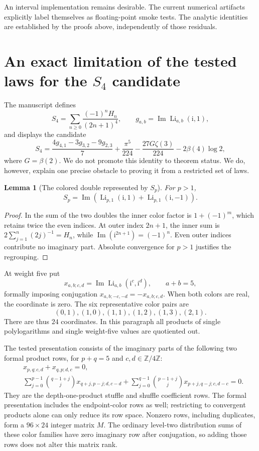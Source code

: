 \documentclass[11pt]{article}
\numberwithin{equation}{section}
\newtheorem{lemma}[theorem]{Lemma}
\theoremstyle{definition}\newtheorem{definition}[theorem]{Definition}
\theoremstyle{remark}\newtheorem{remark}[theorem]{Remark}
\DeclareMathOperator{\Li}{Li}
\DeclareMathOperator{\Ima}{Im}
\newcommand{\Z}{\mathbb Z}\newcommand{\U}{\mathcal U}
\newcommand{\ii}{\mathrm i}
\begin{document}
An interval implementation remains desirable. The current numerical
artifacts explicitly label themselves as floating-point smoke tests. The
analytic identities are established by the proofs above, independently of
those residuals.

\section{An exact limitation of the tested laws for the \texorpdfstring{$S_4$}{S4} candidate}

The manuscript defines
\[
S_4=\sum_{n\ge0}\frac{(-1)^nH_n}{(2n+1)^4},\qquad
g_{a,b}=\Ima\Li_{a,b}(\ii,1),
\]
and displays the candidate
\begin{equation}\label{eq:S4candidate}
S_4=\frac{4g_{4,1}-3g_{3,2}-9g_{2,3}}7
+\frac{\pi^5}{224}-\frac{27G\zeta(3)}{224}
-2\beta(4)\log2,
\end{equation}
where $G=\beta(2)$. We do not promote this identity to theorem status.
We do, however, explain one precise obstacle to proving it from a restricted
set of laws.

\begin{lemma}[The colored double represented by $S_p$]\label{lem:Sdouble}
For $p>1$,
\begin{equation}\label{eq:Sdouble}
S_p=\Ima\left(\Li_{p,1}(\ii,1)+\Li_{p,1}(\ii,-1)\right).
\end{equation}
\end{lemma}
\begin{proof}
In the sum of the two doubles the inner color factor is $1+(-1)^m$,
which retains twice the even indices. At outer index $2n+1$, the inner
sum is $2\sum_{j=1}^n(2j)^{-1}=H_n$, while
$\Ima(\ii^{2n+1})=(-1)^n$. Even outer indices contribute no imaginary
part. Absolute convergence for $p>1$ justifies the regrouping.
\end{proof}

At weight five put
\[
x_{a,b;c,d}=\Ima\Li_{a,b}(\ii^c,\ii^d),\qquad a+b=5,
\]
formally imposing conjugation
$x_{a,b;-c,-d}=-x_{a,b;c,d}$. When both colors are real, the coordinate is
zero. The six representative color pairs are
\[
(0,1),(1,0),(1,1),(1,2),(1,3),(2,1).
\]
There are thus $24$ coordinates. In this paragraph all products of single
polylogarithms and single weight-five values are quotiented out.

The tested presentation consists of the imaginary parts of the following
two formal product rows, for $p+q=5$ and $c,d\in\Z/4\Z$:
\begin{align}\label{eq:Srows}
&x_{p,q;c,d}+x_{q,p;d,c}=0,\\
&\sum_{j=0}^{p-1}\binom{q-1+j}{j}x_{q+j,p-j;d,c-d}
+\sum_{j=0}^{q-1}\binom{p-1+j}{j}x_{p+j,q-j;c,d-c}=0.
\end{align}
They are the depth-one-product stuffle and shuffle coefficient rows.
The formal presentation includes the endpoint-color rows as well; restricting
to convergent products alone can only reduce its row space. Nonzero rows,
including duplicates, form a $96\times24$ integer matrix $M$.
The ordinary level-two distribution sums of these color families have
zero imaginary row after conjugation, so adding those rows does not alter
this matrix rank.
\end{document}
